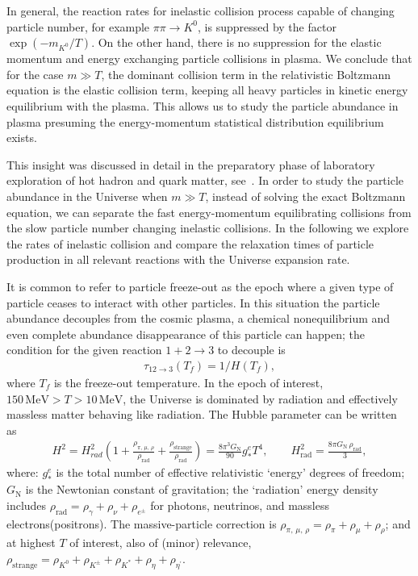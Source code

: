 In general, the reaction rates for inelastic collision process capable of changing particle number, for example $\pi\pi\to K^0$, is suppressed by the factor $\exp{(-m_{K^0}/T)}$. On the other hand, there is no suppression for the elastic momentum and energy exchanging particle collisions in plasma. We conclude that for the case $m\gg T$, the dominant collision term in the relativistic Boltzmann equation is the elastic collision term, keeping all heavy particles in kinetic energy equilibrium with the plasma. This allows us to study the particle abundance in plasma presuming the energy-momentum statistical distribution equilibrium exists. 

This insight was discussed in detail in the preparatory phase of laboratory exploration of hot hadron and quark matter, see~\cite{Koch:1986ud}. In order to study the particle abundance in the Universe when $m\gg T$, instead of solving the exact Boltzmann equation, we can separate the fast energy-momentum equilibrating collisions from the slow particle number changing inelastic collisions. In the following we explore the rates of inelastic collision and compare the relaxation times of particle production in all relevant reactions with the Universe expansion rate.

It is common to refer to particle freeze-out as the epoch where a given type of particle ceases to interact with other particles. In this situation the particle abundance decouples from the cosmic plasma, a chemical nonequilibrium and even complete abundance disappearance of this particle can happen; the condition for the given reaction $1+2\rightarrow 3$ to decouple is
\begin{align}
\tau_{12\rightarrow 3}(T_f)=1/H(T_f),
\end{align}
where $T_f$ is the freeze-out temperature.
In the epoch of interest, $150\,\mathrm{MeV}>T>10\,\mathrm{MeV}$, the Universe is dominated by radiation and effectively massless matter behaving like radiation. The Hubble parameter can be written as~\cite{Kolb:1990vq}
\begin{align}\label{H2g}
H^2=H^2_{rad}\left(1+\frac{\rho_{\pi,\,\mu,\,\rho}}{\rho_\mathrm{rad}}+\frac{\rho_\mathrm{strange}}{\rho_\mathrm{rad}}\right)=\frac{8\pi^3G_\mathrm{N}}{90}g^e_\ast T^4,\qquad H^2_\mathrm{rad}=\frac{8\pi G_\mathrm{N}\,\rho_\mathrm{rad}}{3},
\end{align}
where: $g^e_\ast$ is the total number of effective relativistic `energy' degrees of freedom; $G_\mathrm{N}$ is the Newtonian constant of gravitation; the `radiation' energy density includes $\rho_\mathrm{rad}=\rho_\gamma+\rho_\nu+\rho_{e^\pm}$ for photons, neutrinos, and massless electrons(positrons). The massive-particle correction is $\rho_{\pi,\,\mu,\,\rho}=\rho_\pi+\rho_\mu+\rho_\rho$; and at highest $T$ of interest, also of (minor) relevance, $\rho_\mathrm{strange}=\rho_{K^0}+\rho_{K^\pm}+\rho_{K^\ast}+\rho_{\eta}+\rho_{\eta^\prime}$.

